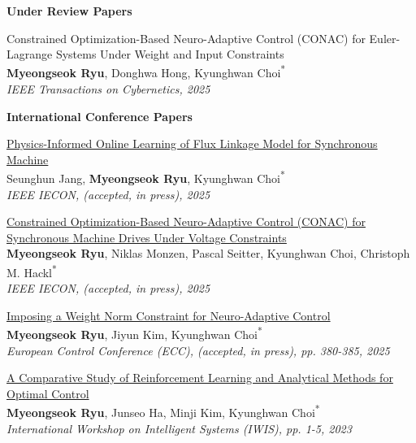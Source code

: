 
\textbf{Under Review Papers}

\footnotesize{\begin{etaremune}

    \item {
        Constrained Optimization-Based Neuro-Adaptive Control (CONAC) for Euler-Lagrange Systems Under Weight and Input Constraints
        \\
        \textbf{Myeongseok Ryu}, Donghwa Hong, Kyunghwan Choi\textsuperscript{{*}}
        \\
        \textit{
            IEEE Transactions on Cybernetics, 2025
        }
    }

\end{etaremune}}
    
\textbf{International Conference Papers}

\footnotesize{\begin{etaremune}

    \item {
        \href{https://doi.org/10.36227/techrxiv.172893538.89561848/v1}{Physics-Informed Online Learning of Flux Linkage Model for Synchronous Machine}
        \\
        Seunghun Jang, \textbf{Myeongseok Ryu}, Kyunghwan Choi\textsuperscript{{*}}
        \\
        \textit{
            IEEE IECON, (accepted, in press), 2025
        }
    }

    \item {
        \href{https://doi.org/10.36227/techrxiv.174585949.94234666/v1}{Constrained Optimization-Based Neuro-Adaptive Control (CONAC) for Synchronous Machine Drives Under Voltage Constraints}
        \\
        \textbf{Myeongseok Ryu}, Niklas Monzen, Pascal Seitter, Kyunghwan Choi, Christoph M. Hackl\textsuperscript{{*}}
        \\
        \textit{
            IEEE IECON, (accepted, in press), 2025
        }
    }

    \item {
        \href{https://doi.org/10.36227/techrxiv.173014412.26480551/v1}{Imposing a Weight Norm Constraint for Neuro-Adaptive Control}
        \\
        \textbf{Myeongseok Ryu}, Jiyun Kim, Kyunghwan Choi\textsuperscript{{*}}
        \\
        \textit{
            European Control Conference (ECC), (accepted, in press), pp. 380-385, 2025
        }
    }

    \item {
        \href{https://doi.org/10.1109/IWIS58789.2023.10284677}{A Comparative Study of Reinforcement Learning and Analytical Methods for Optimal Control}
        \\
        \textbf{Myeongseok Ryu}, Junseo Ha, Minji Kim, Kyunghwan Choi\textsuperscript{{*}}
        \\
        \textit{
            International Workshop on Intelligent Systems (IWIS), pp. 1-5, 2023
        }
    }

\end{etaremune}}
    
